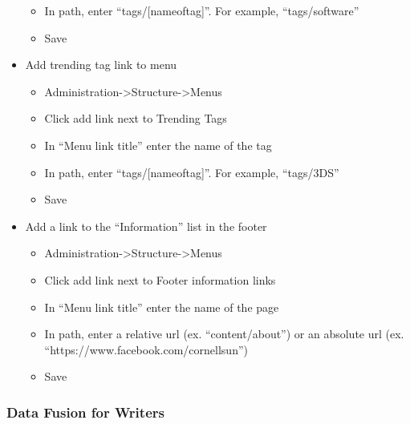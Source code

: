 \documentclass[11pt]{article} %
\begin{document}
\begin{itemize}
\begin{itemize}
	\item In path, enter “tags/[nameoftag]”. For example, “tags/software”
	\item Save
	\end{itemize}
\item Add trending tag link to menu
	\begin{itemize}
	\itemindent 10pt
	\item Administration-\textgreater Structure-\textgreater Menus
	\item Click add link next to Trending Tags
	\item In “Menu link title” enter the name of the tag
	\item In path, enter “tags/[nameoftag]”. For example, “tags/3DS”
	\item Save
	\end{itemize}
\item Add a link to the “Information” list in the footer
	\begin{itemize}
	\itemindent 10pt
	\item Administration-\textgreater Structure-\textgreater Menus
	\item Click add link next to Footer information links
	\item In “Menu link title” enter the name of the page
	\item In path, enter a relative url (ex. “content/about”) or an absolute url (ex. “https://www.facebook.com/cornellsun”)
	\item Save
	\end{itemize}
\end{itemize}

\subsubsection{Data Fusion for Writers}
\end{document}
